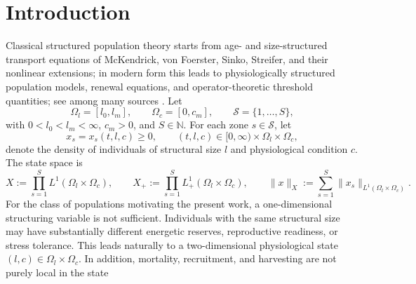 \documentclass[pdflatex,sn-mathphys-num]{sn-jnl}%
\begin{document}


\maketitle

\section{Introduction}\label{sec:introduction}
Classical structured population theory starts from age- and size-structured transport
equations of McKendrick, von Foerster, Sinko, Streifer, and their nonlinear
extensions; in modern form this leads to physiologically structured population
models, renewal equations, and operator-theoretic threshold quantities; see among many sources \cite{McKendrick1926,wang2026elliptic,VonFoerster1959,SinkoStreifer1967,Webb1985,yu2026chemotactic,vargelouglu2026efficient,MetzDiekmann1986,Iannelli1995,Cushing1998,wang2025analysis,monforte2022evaluation,MagalRuan2018,DiekmannEtAl2010,wang2026damage,murray2002mathematical,hu2024stability,wang2021global,wu2014spectral,wang2025analysis1}. Let
\[
\Omega_l=[l_0,l_m],\qquad \Omega_c=[0,c_m],\qquad \mathcal S=\{1,\dots,S\},
\]
with \(0<l_0<l_m<\infty\), \(c_m>0\), and \(S\in\mathbb N\). For each zone
\(s\in\mathcal S\), let
\[
x_s=x_s(t,l,c)\ge 0,
\qquad
(t,l,c)\in [0,\infty)\times\Omega_l\times\Omega_c,
\]
denote the density of individuals of structural size \(l\) and physiological
condition \(c\). The state space is
\[
X:=\prod_{s=1}^S L^1(\Omega_l\times\Omega_c),
\qquad
X_+:=\prod_{s=1}^S L^1_+(\Omega_l\times\Omega_c),
\qquad
\|x\|_X:=\sum_{s=1}^S\|x_s\|_{L^1(\Omega_l\times\Omega_c)}.
\]
For the class of populations motivating the present work, a one-dimensional
structuring variable is not sufficient. Individuals with the same structural size may
have substantially different energetic reserves, reproductive readiness, or stress
tolerance. This leads naturally to a two-dimensional physiological state
\((l,c)\in\Omega_l\times\Omega_c\).
In addition, mortality, recruitment, and harvesting are not purely local in the state
\end{document}
